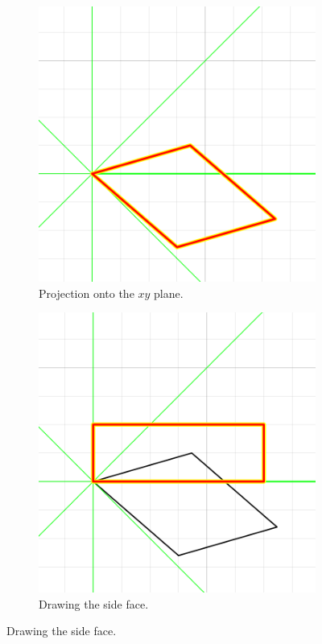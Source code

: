 \documentclass[11pt,a4paper]{article}
\begin{document}
\begin{figure}
\begin{subfigure}[t]{0.4\textwidth}
\centering
\includegraphics[scale=0.6]{png/demo_step3.png} 
\caption{Projection onto the $xy$ plane.}
\label{fig:demo1_c}
\end{subfigure}
\begin{subfigure}[t]{0.4\textwidth}
\centering
\includegraphics[scale=0.6]{png/demo_step4.png} 
\caption{Drawing the side face.}
\label{fig:demo1_d}
\end{subfigure}


\end{figure}
\end{document}
